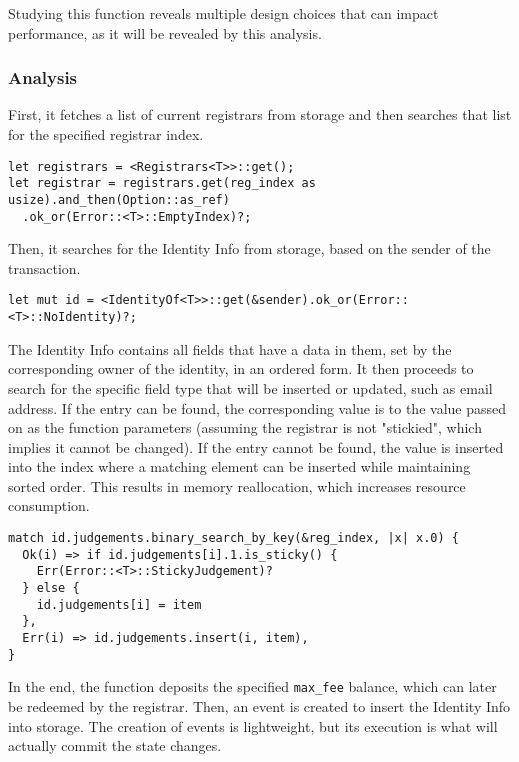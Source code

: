 \documentclass[11pt,a4paper]{article}
\begin{document}
Studying this function reveals multiple design choices that can impact
performance, as it will be revealed by this analysis.
\newline

\subsubsection{Analysis}

First, it fetches a list of current registrars from storage and then searches
that list for the specified registrar index.

\begin{verbatim}
let registrars = <Registrars<T>>::get();
let registrar = registrars.get(reg_index as usize).and_then(Option::as_ref)
  .ok_or(Error::<T>::EmptyIndex)?;
\end{verbatim}

Then, it searches for the Identity Info from storage, based on the sender of the
transaction.

\begin{verbatim}
let mut id = <IdentityOf<T>>::get(&sender).ok_or(Error::<T>::NoIdentity)?;
\end{verbatim}

The Identity Info contains all fields that have a data in them, set by the
corresponding owner of the identity, in an ordered form. It then proceeds to
search for the specific field type that will be inserted or updated, such as
email address. If the entry can be found, the corresponding value is to the
value passed on as the function parameters (assuming the registrar is not
"stickied", which implies it cannot be changed). If the entry cannot be found,
the value is inserted into the index where a matching element can be inserted
while maintaining sorted order. This results in memory reallocation, which
increases resource consumption.

\begin{verbatim}
match id.judgements.binary_search_by_key(&reg_index, |x| x.0) {
  Ok(i) => if id.judgements[i].1.is_sticky() {
    Err(Error::<T>::StickyJudgement)?
  } else {
    id.judgements[i] = item
  },
  Err(i) => id.judgements.insert(i, item),
}
\end{verbatim}

In the end, the function deposits the specified \verb|max_fee| balance, which
can later be redeemed by the registrar. Then, an event is created to insert the
Identity Info into storage. The creation of events is lightweight, but its
execution is what will actually commit the state changes.
\end{document}
